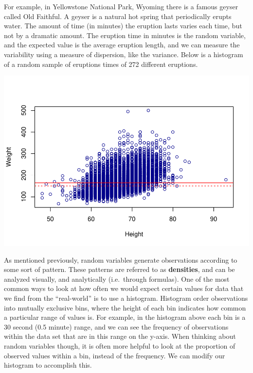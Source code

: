 \documentclass[
]{book}
\newenvironment{Shaded}{\begin{snugshade}}{\end{snugshade}}
\newcommand{\DataTypeTok}[1]{\textcolor[rgb]{0.13,0.29,0.53}{#1}}
\newcommand{\DecValTok}[1]{\textcolor[rgb]{0.00,0.00,0.81}{#1}}
\newcommand{\FloatTok}[1]{\textcolor[rgb]{0.00,0.00,0.81}{#1}}
\newcommand{\KeywordTok}[1]{\textcolor[rgb]{0.13,0.29,0.53}{\textbf{#1}}}
\newcommand{\NormalTok}[1]{#1}
\newcommand{\OperatorTok}[1]{\textcolor[rgb]{0.81,0.36,0.00}{\textbf{#1}}}
\newcommand{\StringTok}[1]{\textcolor[rgb]{0.31,0.60,0.02}{#1}}
\begin{document}
For example, in Yellowstone National Park, Wyoming there is a famous geyser called Old Faithful. A geyser is a natural hot spring that periodically erupts water. The amount of time (in minutes) the eruption lasts varies each time, but not by a dramatic amount. The eruption time in minutes is the random variable, and the expected value is the average eruption length, and we can measure the variability using a measure of dispersion, like the variance. Below is a histogram of a random sample of eruptions times of 272 different eruptions.

\begin{Shaded}
\end{Shaded}

\includegraphics{_main_files/figure-latex/unnamed-chunk-213-1.pdf}

As mentioned previously, random variables generate observations according to some sort of pattern. These patterns are referred to as \textbf{densities}, and can be analyzed visually, and analytically (i.e.~through formulas). One of the most common ways to look at how often we would expect certain values for data that we find from the ``real-world'' is to use a histogram. Histogram order observations into mutually exclusive bins, where the height of each bin indicates how common a particular range of values is. For example, in the histogram above each bin is a 30 second (0.5 minute) range, and we can see the frequency of observations within the data set that are in this range on the y-axis. When thinking about random variables though, it is often more helpful to look at the proportion of observed values within a bin, instead of the frequency. We can modify our histogram to accomplish this.
\end{document}
